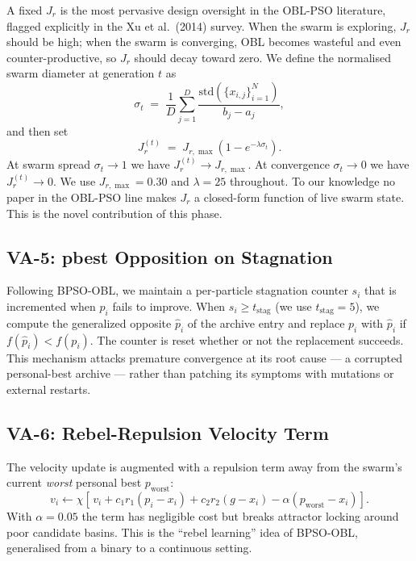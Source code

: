 \documentclass[11pt,a4paper]{article}
\newcommand{\jrt}{J_{r}^{(t)}}
\newcommand{\jrmax}{J_{r,\max}}
\begin{document}
A fixed $J_r$ is the most pervasive design oversight in the OBL-PSO
literature, flagged explicitly in the Xu et al.\ (2014) survey. When the
swarm is exploring, $J_r$ should be high; when the swarm is converging,
OBL becomes wasteful and even counter-productive, so $J_r$ should decay
toward zero. We define the normalised swarm diameter at generation $t$ as
\begin{equation}
\sigma_t \;=\; \frac{1}{D}\sum_{j=1}^{D}
              \frac{\mathrm{std}\!\left(\{x_{i,j}\}_{i=1}^{N}\right)}{b_j - a_j},
\label{eq:sigma}
\end{equation}
and then set
\begin{equation}
\boxed{\;\jrt \;=\; \jrmax\!\left(1 - e^{-\lambda \sigma_t}\right).\;}
\label{eq:jr}
\end{equation}
At swarm spread $\sigma_t \to 1$ we have $\jrt \to \jrmax$. At convergence
$\sigma_t \to 0$ we have $\jrt \to 0$. We use $\jrmax = 0.30$ and
$\lambda = 25$ throughout. To our knowledge no paper in the OBL-PSO line
makes $J_r$ a closed-form function of live swarm state. This is the novel
contribution of this phase.

\subsection{VA-5: pbest Opposition on Stagnation}

Following BPSO-OBL, we maintain a per-particle stagnation counter $s_i$
that is incremented when $p_i$ fails to improve. When $s_i \geq
t_{\text{stag}}$ (we use $t_{\text{stag}} = 5$), we compute the
generalized opposite $\hat{p}_i$ of the archive entry and replace $p_i$
with $\hat{p}_i$ if $f(\hat{p}_i) < f(p_i)$. The counter is reset whether
or not the replacement succeeds. This mechanism attacks premature
convergence at its root cause --- a corrupted personal-best archive ---
rather than patching its symptoms with mutations or external restarts.

\subsection{VA-6: Rebel-Repulsion Velocity Term}

The velocity update is augmented with a repulsion term away from the
swarm's current \emph{worst} personal best $p_{\text{worst}}$:
\begin{equation}
v_i \leftarrow \chi\!\left[\,v_i + c_1 r_1 (p_i - x_i)
                              + c_2 r_2 (g - x_i)
                              - \alpha (p_{\text{worst}} - x_i)\right].
\label{eq:rebel}
\end{equation}
With $\alpha = 0.05$ the term has negligible cost but breaks attractor
locking around poor candidate basins. This is the ``rebel learning'' idea
of BPSO-OBL, generalised from a binary to a continuous setting.
\end{document}
